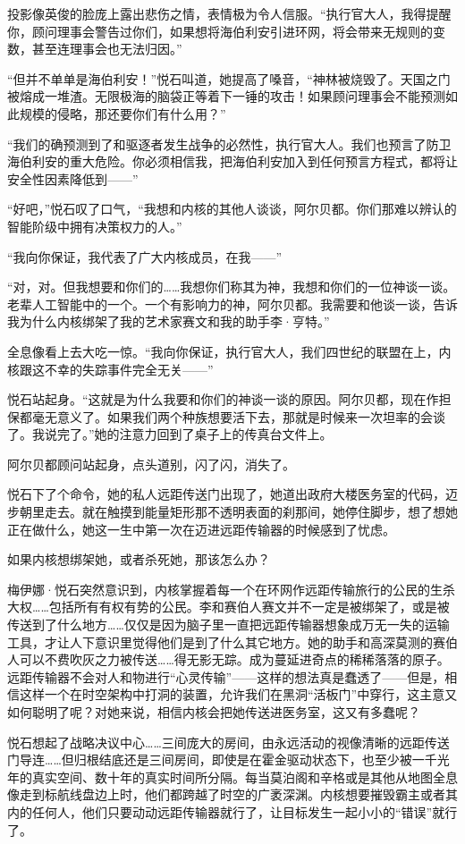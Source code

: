 \documentclass[AutoFakeBold=true]{book}
\begin{document}
投影像英俊的脸庞上露出悲伤之情，表情极为令人信服。``执行官大人，我得提醒你，顾问理事会警告过你们，如果想将海伯利安引进环网，将会带来无规则的变数，甚至连理事会也无法归因。''

``但并不单单是海伯利安！''悦石叫道，她提高了嗓音，``神林被烧毁了。天国之门被熔成一堆渣。无限极海的脑袋正等着下一锤的攻击！如果顾问理事会不能预测如此规模的侵略，那还要你们有什么用？''

``我们的确预测到了和驱逐者发生战争的必然性，执行官大人。我们也预言了防卫海伯利安的重大危险。你必须相信我，把海伯利安加入到任何预言方程式，都将让安全性因素降低到——''

``好吧，''悦石叹了口气，``我想和内核的其他人谈谈，阿尔贝都。你们那难以辨认的智能阶级中拥有决策权力的人。''

``我向你保证，我代表了广大内核成员，在我——''

``对，对。但我想要和你们的……我想你们称其为神，我想和你们的一位神谈一谈。老辈人工智能中的一个。一个有影响力的神，阿尔贝都。我需要和他谈一谈，告诉我为什么内核绑架了我的艺术家赛文和我的助手李·亨特。''

全息像看上去大吃一惊。``我向你保证，执行官大人，我们四世纪的联盟在上，内核跟这不幸的失踪事件完全无关——''

悦石站起身。``这就是为什么我要和你们的神谈一谈的原因。阿尔贝都，现在作担保都毫无意义了。如果我们两个种族想要活下去，那就是时候来一次坦率的会谈了。我说完了。''她的注意力回到了桌子上的传真台文件上。

阿尔贝都顾问站起身，点头道别，闪了闪，消失了。

悦石下了个命令，她的私人远距传送门出现了，她道出政府大楼医务室的代码，迈步朝里走去。就在触摸到能量矩形那不透明表面的刹那间，她停住脚步，想了想她正在做什么，她这一生中第一次在迈进远距传输器的时候感到了忧虑。

如果内核想绑架她，或者杀死她，那该怎么办？

梅伊娜·悦石突然意识到，内核掌握着每一个在环网作远距传输旅行的公民的生杀大权……包括所有有权有势的公民。李和赛伯人赛文并不一定是被绑架了，或是被传送到了什么地方……仅仅是因为脑子里一直把远距传输器想象成万无一失的运输工具，才让人下意识里觉得他们是到了什么其它地方。她的助手和高深莫测的赛伯人可以不费吹灰之力被传送……得无影无踪。成为蔓延进奇点的稀稀落落的原子。远距传输器不会对人和物进行``心灵传输''——这样的想法真是蠢透了——但是，相信这样一个在时空架构中打洞的装置，允许我们在黑洞``活板门''中穿行，这主意又如何聪明了呢？对她来说，相信内核会把她传送进医务室，这又有多蠢呢？

悦石想起了战略决议中心……三间庞大的房间，由永远活动的视像清晰的远距传送门导连……但归根结底还是三间房间，即使是在霍金驱动状态下，也至少被一千光年的真实空间、数十年的真实时间所分隔。每当莫泊阁和辛格或是其他从地图全息像走到标航线盘边上时，他们都跨越了时空的广袤深渊。内核想要摧毁霸主或者其内的任何人，他们只要动动远距传输器就行了，让目标发生一起小小的``错误''就行了。
\end{document}
